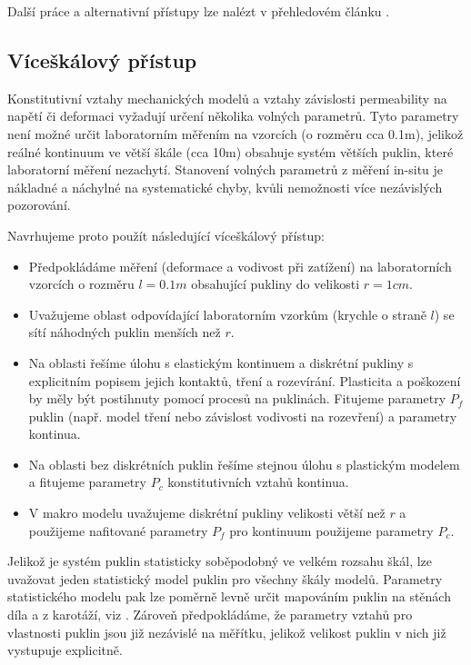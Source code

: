 \documentclass{article}
\begin{document}
Další práce a alternativní přístupy lze nalézt v přehledovém článku \cite{Shahbazi2020a}. 




\subsection{Víceškálový přístup}
\label{sec:mikroskala}
Konstitutivní vztahy mechanických modelů a vztahy závislosti permeability na napětí či deformaci vyžadují určení 
několika volných parametrů. Tyto parametry není možné určit laboratorním měřením na vzorcích (o rozměru cca 0.1m), 
jelikož reálné kontinuum ve větší škále (cca 10m) obsahuje systém větších puklin, které laboratorní měření nezachytí. 
Stanovení volných parametrů z měření in-situ je nákladné a náchylné na systematické chyby, kvůli nemožnosti 
více nezávislých pozorování. 


Navrhujeme proto použít následující víceškálový přístup:
\begin{itemize}
 \item Předpokládáme měření (deformace a vodivost při zatížení) na laboratorních vzorcích o rozměru $l=0.1m$ obsahující pukliny do velikosti $r=1cm$.
 \item Uvažujeme oblast odpovídající laboratorním vzorkům (krychle o straně $l$) se sítí náhodných puklin menších než $r$.
 \item Na oblasti řešíme úlohu s elastickým kontinuem a diskrétní pukliny s explicitním popisem jejich kontaktů, tření a rozevírání.
       Plasticita a poškození by měly být postihnuty pomocí procesů na puklinách. Fitujeme parametry $P_f$ puklin (např. model tření nebo závislost vodivosti na rozevření) a parametry kontinua. 
 \item Na oblasti bez diskrétních puklin řešíme stejnou úlohu s plastickým modelem a fitujeme parametry $P_c$ konstitutivních vztahů kontinua.
 \item V makro modelu uvažujeme diskrétní pukliny velikosti větší než $r$ a použijeme nafitované parametry $P_f$ pro kontinuum použijeme parametry $P_c$.
\end{itemize}
Jelikož je systém puklin statisticky soběpodobný ve velkém rozsahu škál, lze uvažovat jeden statistický model puklin pro všechny škály modelů.
Parametry statistického modelu pak lze poměrně levně určit mapováním puklin na stěnách díla a z karotáží, viz \cite{Bonnet2001}.
Zároveň předpokládáme, že parametry vztahů pro vlastnosti puklin jsou již nezávislé na měřítku, 
jelikož velikost puklin v nich již vystupuje explicitně. 
\end{document}
